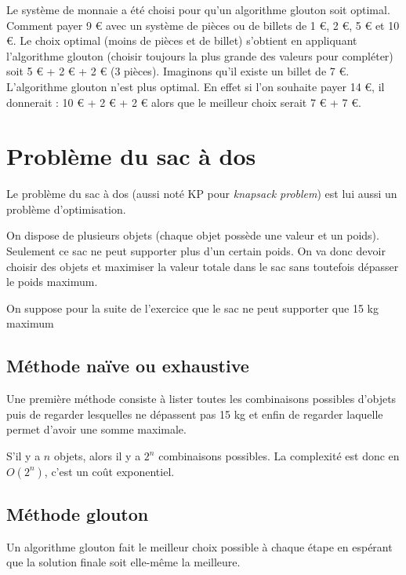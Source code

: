 \begin{remarque}[]{}
 Le système de monnaie a été choisi pour qu'un algorithme glouton soit optimal. Comment payer 9 \euro{}  avec un système de pièces ou de billets de 1 \euro{}, 2 \euro{}, 5 \euro{} et 10 \euro{}. Le choix optimal (moins de pièces et de billet) s'obtient en appliquant l'algorithme glouton (choisir toujours la plus grande des valeurs pour compléter) soit 5 \euro{} + 2 \euro{} + 2 \euro{} (3 pièces). Imaginons qu'il existe un billet de 7 \euro{}. L'algorithme glouton n'est plus optimal. En effet si l'on souhaite payer 14 \euro{}, il donnerait : 10 \euro{} + 2 \euro{} + 2 \euro{} alors que le meilleur choix serait 7 \euro{} + 7 \euro{}.\\

\end{remarque}
 



\section{Problème du sac à dos}
 
 
Le problème du sac à dos (aussi noté KP pour \emph{knapsack problem}) est lui aussi un problème d'optimisation. 

On dispose de plusieurs objets (chaque objet possède une valeur et un poids). Seulement ce sac ne peut supporter plus d'un certain poids. On va donc devoir choisir des objets et maximiser la valeur totale dans le sac sans toutefois dépasser le poids maximum.

On suppose pour la suite de l'exercice que le sac ne peut supporter que 15 kg maximum

\subsection{Méthode naïve ou exhaustive}

Une première méthode consiste à lister toutes les combinaisons possibles d'objets puis de regarder lesquelles ne dépassent pas 15 kg et enfin de regarder laquelle permet d'avoir une somme maximale.

S'il y a $n$ objets, alors il y a $2^n$ combinaisons possibles. La complexité est donc en $O(2^n)$, c'est un coût exponentiel.
\subsection{Méthode glouton}

Un algorithme glouton fait le meilleur choix possible à chaque étape en espérant que la solution finale soit elle-même la meilleure.
	
